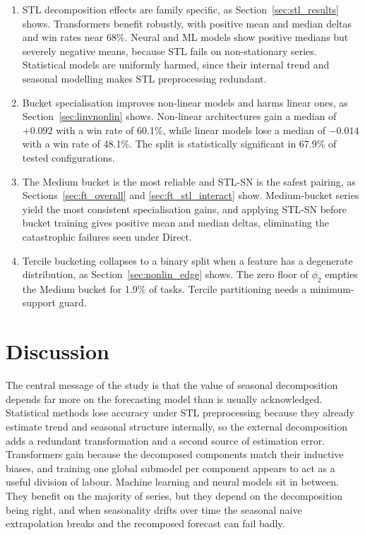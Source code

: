 \documentclass[pdflatex,sn-mathphys-num]{sn-jnl}
\theoremstyle{thmstyleone}
\theoremstyle{thmstyletwo}
\theoremstyle{thmstylethree}
\begin{document}
\begin{enumerate}
  \item STL decomposition effects are family specific, as
    Section~\ref{sec:stl_results} shows. Transformers benefit robustly, with
    positive mean and median deltas and win rates near 68\%. Neural and ML
    models show positive medians but severely negative means, because STL
    fails on non-stationary series. Statistical models are uniformly harmed,
    since their internal trend and seasonal modelling makes STL preprocessing
    redundant.

  \item Bucket specialisation improves non-linear models and harms linear
    ones, as Section~\ref{sec:linvnonlin} shows. Non-linear architectures gain
    a median of $+0.092$ with a win rate of 60.1\%, while linear models lose a
    median of $-0.014$ with a win rate of 48.1\%. The split is statistically
    significant in 67.9\% of tested configurations.

  \item The Medium bucket is the most reliable and STL-SN is the safest
    pairing, as Sections~\ref{sec:ft_overall} and \ref{sec:ft_stl_interact}
    show. Medium-bucket series yield the most consistent specialisation gains,
    and applying STL-SN before bucket training gives positive mean and median
    deltas, eliminating the catastrophic failures seen under Direct.

  \item Tercile bucketing collapses to a binary split when a feature has a
    degenerate distribution, as Section~\ref{sec:nonlin_edge} shows. The zero
    floor of $\phi_2$ empties the Medium bucket for 1.9\% of tasks. Tercile
    partitioning needs a minimum-support guard.
\end{enumerate}

\section{Discussion}\label{sec:discussion}

The central message of the study is that the value of seasonal decomposition
depends far more on the forecasting model than is usually acknowledged.
Statistical methods lose accuracy under STL preprocessing because they already
estimate trend and seasonal structure internally, so the external
decomposition adds a redundant transformation and a second source of
estimation error. Transformers gain because the decomposed components match
their inductive biases, and training one global submodel per component appears
to act as a useful division of labour. Machine learning and neural models sit
in between. They benefit on the majority of series, but they depend on the
decomposition being right, and when seasonality drifts over time the seasonal
naive extrapolation breaks and the recomposed forecast can fail badly.
\end{document}
